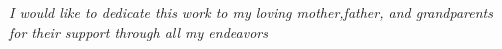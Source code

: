 \clearpage
\vspace*{\fill}
	\begin{center}
		\begin{minipage}{\textwidth}
				\textit{I would like to dedicate this work to my loving mother,father, and grandparents for their support through all my endeavors}
		\end{minipage}
	\end{center}
\vfill %
\clearpage